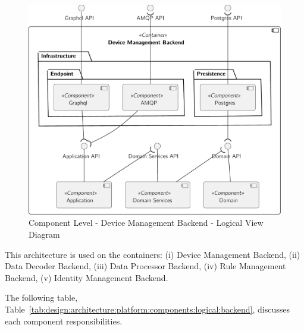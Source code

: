 \begin{figure}[H]
   \centering
   \includegraphics[page=1,width=0.8\columnwidth]{assets/diagrams/design/architectural/level3/logical/device-management-backend.pdf}
   \caption[Component Level - Device Management Backend - Logical View Diagram]{Component Level - Device Management Backend - Logical View Diagram}
   \label{fig:design:architecture:platform:component:logical:diagram:device}
\end{figure}

This architecture is used on the containers: (i) Device Management Backend, (ii) Data Decoder Backend, (iii) Data Processor Backend, (iv) Rule Management Backend, (v) Identity Management Backend.

The following table, Table~\ref{tab:design:architecture:platform:components:logical:backend}, discusses each component responsibilities.

